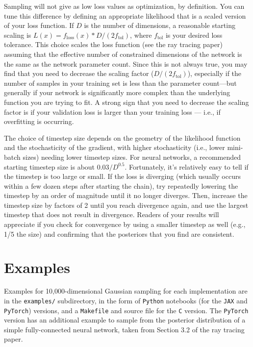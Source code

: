 \documentclass[12pt]{article}
\begin{document}
Sampling will not give as low loss values as optimization, by definition.  You can tune this difference by defining an appropriate likelihood that is a scaled version of your loss function.  If $D$ is the number of dimensions, a reasonable starting scaling is $L(x) = f_\mathrm{loss}(x) * D/(2 f_\mathrm{tol})$, where $f_\mathrm{tol}$ is your desired loss tolerance.  This choice scales the loss function (see the ray tracing paper) assuming that the effective number of constrained dimensions of the network is the same as the network parameter count.  Since this is not always true, you may find that you need to decrease the scaling factor ($D/(2 f_\mathrm{tol})$), especially if the number of samples in your training set is less than the parameter count---but generally if your network is significantly more complex than the underlying function you are trying to fit.  A strong sign that you need to decrease the scaling factor is if your validation loss is larger than your training loss --- i.e., if overfitting is occurring.

The choice of timestep size depends on the geometry of the likelihood function and the stochasticity of the gradient, with higher stochasticity (i.e., lower mini-batch sizes) needing lower timestep sizes.  For neural networks, a recommended starting timestep size is about $0.03/D^{0.5}$.  Fortunately, it's relatively easy to tell if the timestep is too large or small.  If the loss is diverging (which usually occurs within a few dozen steps after starting the chain), try repeatedly lowering the timestep by an order of magnitude until it no longer diverges.  Then, increase the timestep size by factors of 2 until you reach divergence again, and use the largest timestep that does not result in divergence.  Readers of your results will appreciate if you check for convergence by using a smaller timestep as well (e.g., 1/5 the size) and confirming that the posteriors that you find are consistent.

\section{Examples}

Examples for 10,000-dimensional Gaussian sampling for each implementation are in the \texttt{examples/} subdirectory, in the form of \texttt{Python} notebooks (for the \texttt{JAX} and \texttt{PyTorch}) versions, and a \texttt{Makefile} and source file for the \texttt{C} version.  The \texttt{PyTorch} version has an additional example to sample from the posterior distribution of a simple fully-connected neural network, taken from Section 3.2 of the ray tracing paper.
\end{document}
